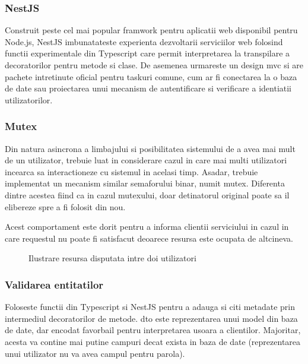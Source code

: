 \subsubsection {NestJS}

Construit peste cel mai popular framwork pentru aplicatii web disponibil pentru Node.js, NestJS imbunatateste experienta dezvoltarii serviciilor web folosind functii experimentale din Typescript care permit interpretarea la transpilare a decoratorilor pentru metode si clase. De asemenea urmareste un design \acrshort{mvc} si are pachete intretinute oficial pentru taskuri comune, cum ar fi conectarea la o baza de date sau proiectarea unui mecanism de autentificare si verificare a identiatii utilizatorilor.

\subsubsection {Mutex}

Din natura asincrona a limbajului si posibilitatea sistemului de a avea mai mult de un utilizator, trebuie luat in considerare cazul in care mai multi utilizatori incearca sa interactioneze cu sistemul in acelasi timp. Asadar, trebuie implementat un mecanism similar semaforului binar, numit mutex. Diferenta dintre acestea fiind ca in cazul mutexului, doar detinatorul original poate sa il elibereze spre a fi folosit din nou.

Acest comportament este dorit pentru a informa clientii serviciului in cazul in care requestul nu poate fi satisfacut deoarece resursa este ocupata de altcineva.

\begin{figure}[H]
  \centering
  \caption{Ilustrare resursa disputata intre doi utilizatori}
\end{figure}


\subsubsection {Validarea entitatilor}

Foloseste functii din Typescript si NestJS pentru a adauga si citi metadate prin intermediul decoratorilor de metode. \acrfull{dto} este reprezentarea unui model din baza de date, dar encodat favorbail pentru interpretarea usoara a clientilor. Majoritar, acesta va contine mai putine campuri decat exista in baza de date (reprezentarea unui utilizator nu va avea campul pentru parola).

